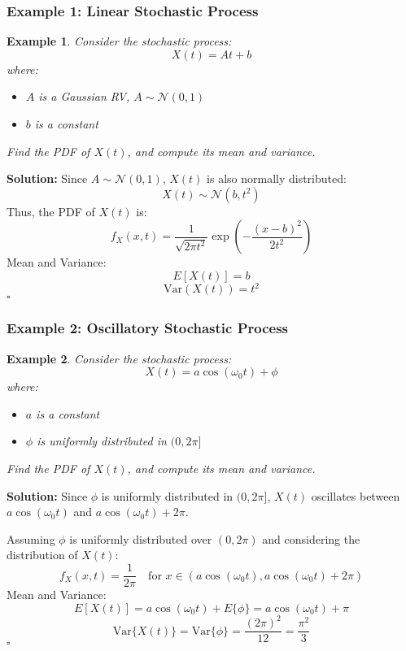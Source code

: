 \documentclass[12pt]{article}
\newtheorem{example}{Example}
\newenvironment{solution}{\noindent\textbf{Solution:}}{\hfill$\square$}
\begin{document}
\subsubsection{Example 1: Linear Stochastic Process}
\begin{example}
Consider the stochastic process:
\[
X(t) = A t + b
\]
where:
\begin{itemize}
    \item \( A \) is a Gaussian RV, \( A \sim \mathcal{N}(0,1) \)
    \item \( b \) is a constant
\end{itemize}
Find the PDF of \( X(t) \), and compute its mean and variance.
\end{example}
\begin{solution}
Since \( A \sim \mathcal{N}(0,1) \), \( X(t) \) is also normally distributed:
\[
X(t) \sim \mathcal{N}(b, t^2)
\]
Thus, the PDF of \( X(t) \) is:
\[
f_X(x,t) = \frac{1}{\sqrt{2\pi t^2}} \exp\left( -\frac{(x - b)^2}{2 t^2} \right)
\]
Mean and Variance:
\[
E[X(t)] = b
\]
\[
\text{Var}(X(t)) = t^2
\]
\end{solution}

\subsubsection{Example 2: Oscillatory Stochastic Process}
\begin{example}
Consider the stochastic process:
\[
X(t) = a \cos(\omega_0 t) + \phi
\]
where:
\begin{itemize}
    \item \( a \) is a constant
    \item \( \phi \) is uniformly distributed in \( (0, 2\pi] \)
\end{itemize}
Find the PDF of \( X(t) \), and compute its mean and variance.
\end{example}
\begin{solution}
Since \( \phi \) is uniformly distributed in \( (0, 2\pi] \), \( X(t) \) oscillates between \( a \cos(\omega_0 t) \) and \( a \cos(\omega_0 t) + 2\pi \).

Assuming \( \phi \) is uniformly distributed over \( (0, 2\pi) \) and considering the distribution of \( X(t) \):
\[
f_X(x,t) = \frac{1}{2\pi} \quad \text{for } x \in (a \cos(\omega_0 t), a \cos(\omega_0 t) + 2\pi)
\]
Mean and Variance:
\[
E[X(t)] = a \cos(\omega_0 t) + E\{\phi\} = a \cos(\omega_0 t) + \pi
\]
\[
\text{Var}\{X(t)\} = \text{Var}\{\phi\} = \frac{(2\pi)^2}{12} = \frac{\pi^2}{3}
\]
\end{solution}
\end{document}
